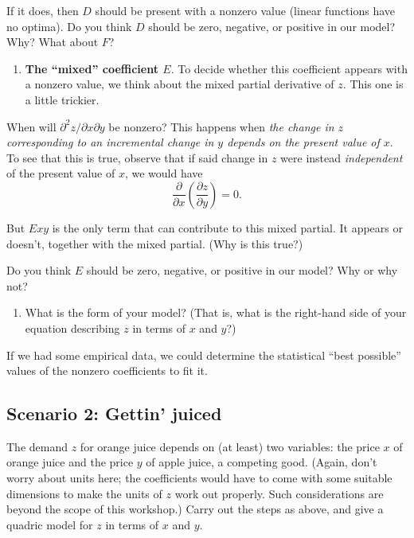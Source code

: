 \documentclass[12pt]{exam}
\theoremstyle{definition}
\begin{document}
If it does, then $D$ should be present with a nonzero value (linear
functions have no optima). Do you think $D$ should be zero, negative, or
positive in our model? Why? What about $F$?


\newpage

\begin{enumerate}
\def\labelenumi{\arabic{enumi}.}
\setcounter{enumi}{3}
\itemsep1pt\parskip0pt
\item
  \textbf{The ``mixed'' coefficient $E$}. To decide whether this
  coefficient appears with a nonzero value, we think about the mixed
  partial derivative of $z$. This one is a little trickier.
\end{enumerate}

When will $\partial^2 z / \partial x \partial y$ be nonzero? This
happens when \emph{the change in $z$ corresponding to an incremental
change in $y$ depends on the present value of $x$}. To see that this is
true, observe that if said change in $z$ were instead \emph{independent}
of the present value of $x$, we would have
\[ \frac{\partial}{\partial x} \left( \frac{\partial z}{\partial y} \right) = 0. \]

But $Exy$ is the only term that can contribute to this mixed partial. It
appears or doesn't, together with the mixed partial. (Why is this true?)

Do you think $E$ should be zero, negative, or positive in our model? Why
or why not?


\begin{enumerate}
\def\labelenumi{\arabic{enumi}.}
\setcounter{enumi}{4}
\itemsep1pt\parskip0pt
\item
  What is the form of your model? (That is, what is the right-hand side
  of your equation describing $z$ in terms of $x$ and $y$?)
\end{enumerate}

If we had some empirical data, we could determine the statistical ``best
possible'' values of the nonzero coefficients to fit it.


\newpage

\subsection{Scenario 2: Gettin' juiced}

The demand $z$ for orange juice depends on (at least) two variables: the
price $x$ of orange juice and the price $y$ of apple juice, a competing
good. (Again, don't worry about units here; the coefficients would have
to come with some suitable dimensions to make the units of $z$ work out
properly. Such considerations are beyond the scope of this workshop.)
Carry out the steps as above, and give a quadric model for $z$ in terms
of $x$ and $y$.
\end{document}
